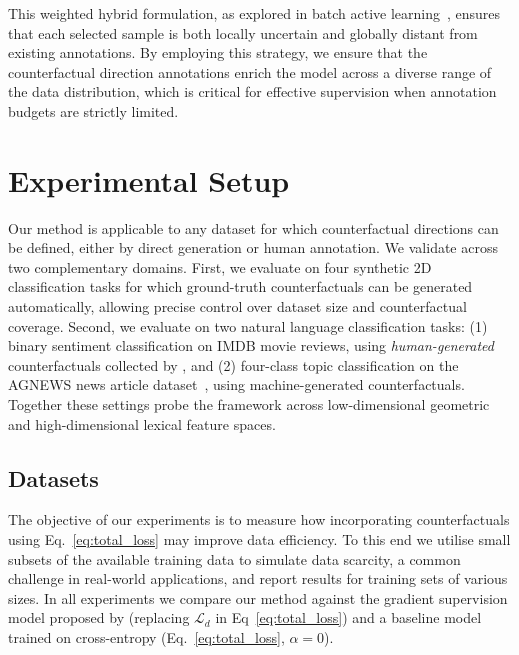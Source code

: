 This weighted hybrid formulation, as explored in batch active learning~\cite{citovsky2021batchactivelearningscale}, ensures that each selected sample is both locally uncertain and globally distant from existing annotations. By employing this strategy, we ensure that the counterfactual direction annotations enrich the model across a diverse range of the data distribution, which is critical for effective supervision when annotation budgets are strictly limited.


\section{Experimental Setup}
\label{sec:experimental_setup}
Our method is applicable to any dataset for which counterfactual directions can be defined, either by direct generation or human annotation. We validate across two complementary domains. First, we evaluate on four synthetic 2D classification tasks for which ground-truth counterfactuals can be generated automatically, allowing precise control over dataset size and counterfactual coverage. Second, we evaluate on two natural language classification tasks: (1) binary sentiment classification on IMDB movie reviews, using \emph{human-generated} counterfactuals collected by \citet{Kaushik2020Learning}, and (2) four-class topic classification on the AGNEWS news article dataset~\cite{NIPS2015_250cf8b5}, using machine-generated counterfactuals. Together these settings probe the framework across low-dimensional geometric and high-dimensional lexical feature spaces.


\subsection{Datasets}
The objective of our experiments is to measure how incorporating counterfactuals using Eq.~\ref{eq:total_loss} may improve data efficiency. To this end we utilise small subsets of the available training data to simulate data scarcity, a common challenge in real-world applications, and report results for training sets of various sizes. In all experiments we compare our method against the gradient supervision model proposed by \citet{teney2020learning} (replacing $\mathcal{L}_d$ in Eq~\ref{eq:total_loss}) and a baseline model trained on cross-entropy (Eq.~\ref{eq:total_loss}, $\alpha=0$).


